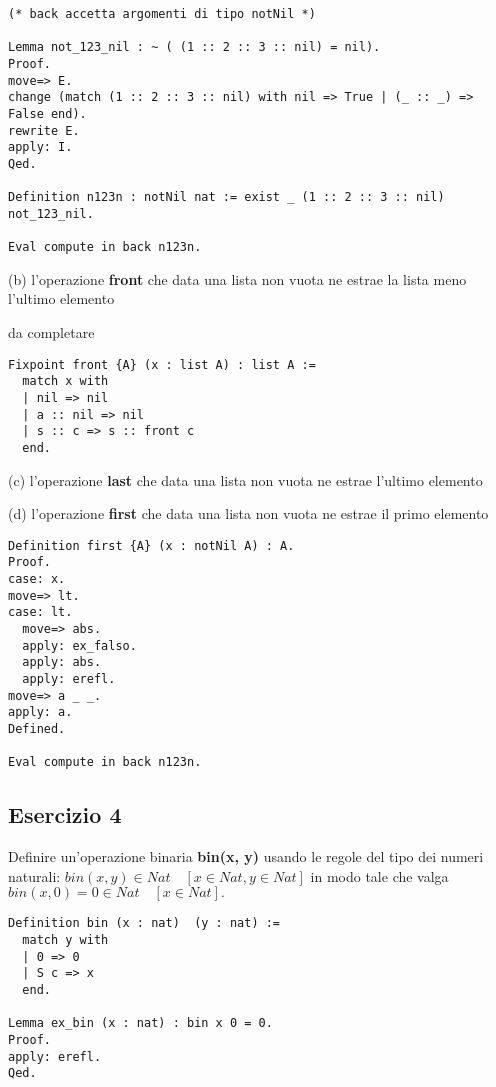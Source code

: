 \begin{lstlisting}[language=Coq]
(* back accetta argomenti di tipo notNil *)

Lemma not_123_nil : ~ ( (1 :: 2 :: 3 :: nil) = nil).
Proof.
move=> E.
change (match (1 :: 2 :: 3 :: nil) with nil => True | (_ :: _) => False end).
rewrite E.
apply: I.
Qed.

Definition n123n : notNil nat := exist _ (1 :: 2 :: 3 :: nil) not_123_nil.

Eval compute in back n123n.
\end{lstlisting}

(b) l'operazione \textbf{front} che data una lista non vuota ne estrae la lista meno
l'ultimo elemento

da completare

\begin{lstlisting}[language=Coq]
Fixpoint front {A} (x : list A) : list A :=
  match x with
  | nil => nil
  | a :: nil => nil
  | s :: c => s :: front c
  end.
\end{lstlisting}

(c) l'operazione \textbf{last} che data una lista non vuota ne estrae l'ultimo elemento

(d) l'operazione \textbf{first} che data una lista non vuota ne estrae il primo
elemento

\begin{lstlisting}[language=Coq]
Definition first {A} (x : notNil A) : A.
Proof.
case: x.
move=> lt.
case: lt.
  move=> abs.
  apply: ex_falso.
  apply: abs.
  apply: erefl.
move=> a _ _.
apply: a.
Defined.

Eval compute in back n123n.
\end{lstlisting}

\subsection{Esercizio 4}

Definire un'operazione binaria \textbf{bin(x, y)} usando le regole del tipo dei numeri
naturali: $bin(x, y) \in Nat \quad [x \in Nat, y \in Nat]$
in modo tale che valga $bin(x, 0) = 0 \in Nat \quad [x \in Nat].$

\begin{lstlisting}[language=Coq]
Definition bin (x : nat)  (y : nat) :=
  match y with
  | 0 => 0
  | S c => x
  end.

Lemma ex_bin (x : nat) : bin x 0 = 0.
Proof.
apply: erefl.
Qed.
\end{lstlisting}

